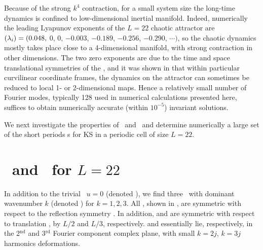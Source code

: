 Because of the strong $k^4$ contraction, for a small system
size the long-time dynamics
is confined to low-dimensional
inertial manifold.
Indeed, numerically the leading Lyapunov exponents of the
$L=22$ chaotic attractor are
$(\lambda_i) = (0.048,$ 0, 0, $-0.003$, $-0.189$, $-0.256$, $-0.290$, $\cdots)$,
so the chaotic dynamics mostly takes place close to a
4-dimensional manifold, with strong contraction in other
dimensions.  The two zero exponents are due to the time and
space translational symmetries of the \KSe, and it was shown
in  that within particular
curvilinear coordinate frames, the dynamics on the attractor
can sometimes be reduced to local 1- or 2-dimensional maps.
Hence a relatively small number of Fourier modes, typically
128 used in numerical calculations presented here, suffices
to obtain numerically accurate (within $10^{-5}$) invariant
solutions.

We next investigate the properties of \eqva\ and \reqva\ and
determine numerically a large set of the short periods \rpo s
for KS in a periodic cell of size $L=22$.

\section{\Eqva\ and \reqva\ for $L=22$}

In addition to the trivial \eqv\ $u=0$ (denoted ),
we find three \eqva\ with dominant wavenumber $k$
(denoted ) for $k = 1, 2, 3$.  All {\eqva}, shown in
, are symmetric with respect to the reflection
symmetry .
In addition,  and  are symmetric with respect
to translation , by $L/2$ and $L/3$, respectively.
 and  essentially lie, respectively, in
the 2$^\mathrm{nd}$ and 3$^\mathrm{rd}$ Fourier component complex plane,
with small $k=2j$, $k=3j$ harmonics deformations.

